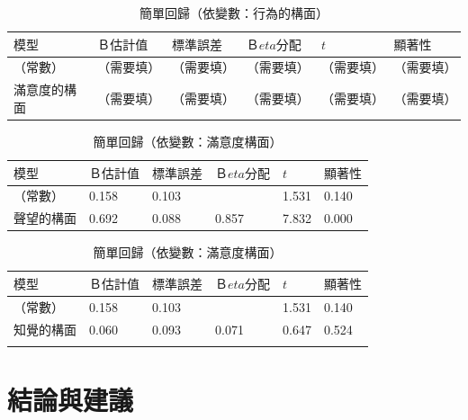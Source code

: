 \begin{table}[htb]
\caption{簡單回歸（依變數：行為的構面）}
\label{tab:r03}
\renewcommand{\arraystretch}{1.2} %
\arrayrulewidth=1pt               %
\tabcolsep=6pt                   %
\begin{tabular}[t]{llllll}  %
\hline
 $模型$&$Ｂ估計值$&$標準誤差$& $Ｂeta分配$& $t$& $顯著性$ \\
\hline
（常數）&（需要填）&（需要填）&（需要填）&（需要填）&（需要填）\\
滿意度的構面&（需要填）&（需要填）&（需要填）&（需要填）&（需要填）\\
\hline
\end{tabular}
\end{table}

\begin{table}[htb]
\caption{簡單回歸（依變數：滿意度構面）}
\label{tab:r2}
\renewcommand{\arraystretch}{1.2} %
\arrayrulewidth=1pt               %
\tabcolsep=6pt                   %
\begin{tabular}[t]{llllll}  %
\hline
 $模型$&$Ｂ估計值$&$標準誤差$& $Ｂeta分配$& $t$& $顯著性$ \\
\hline
（常數）&0.158&0.103&&1.531&0.140\\
聲望的構面&0.692&0.088&0.857&7.832&0.000\\
\hline
\end{tabular}
\end{table}

\begin{table}[htb]
\caption{簡單回歸（依變數：滿意度構面）}
\label{tab:r3}
\renewcommand{\arraystretch}{1.2} %
\arrayrulewidth=1pt               %
\tabcolsep=6pt                   %
\begin{tabular}[t]{llllll}  %
\hline
 $模型$&$Ｂ估計值$&$標準誤差$& $Ｂeta分配$& $t$& $顯著性$ \\
\hline
（常數）&0.158&0.103&&1.531&0.140\\
知覺的構面&0.060&0.093&0.071&0.647&0.524\\
\hline
\centering
\end{tabular}
\end{table}


\chapter{結論與建議}

